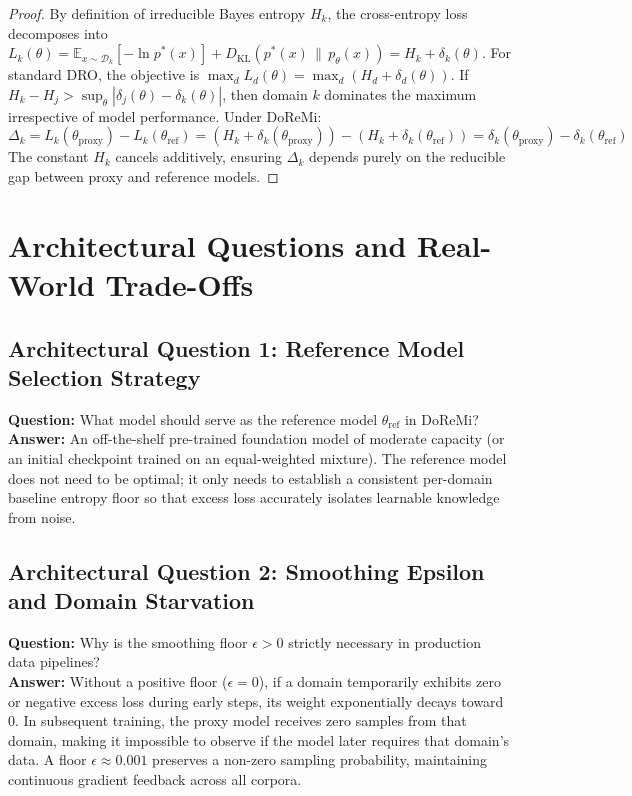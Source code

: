 \documentclass[11pt,a4paper]{article}
\theoremstyle{definition}
\begin{document}
\begin{proof}
By definition of irreducible Bayes entropy $H_k$, the cross-entropy loss decomposes into $L_k(\theta) = \mathbb{E}_{x \sim \mathcal{D}_k}[-\ln p^*(x)] + D_{\text{KL}}(p^*(x) \,\|\, p_\theta(x)) = H_k + \delta_k(\theta)$.
For standard DRO, the objective is $\max_d L_d(\theta) = \max_d (H_d + \delta_d(\theta))$. If $H_k - H_j > \sup_\theta |\delta_j(\theta) - \delta_k(\theta)|$, then domain $k$ dominates the maximum irrespective of model performance.
Under DoReMi:
\begin{equation}
\Delta_k = L_k(\theta_{\text{proxy}}) - L_k(\theta_{\text{ref}}) = \left(H_k + \delta_k(\theta_{\text{proxy}})\right) - \left(H_k + \delta_k(\theta_{\text{ref}})\right) = \delta_k(\theta_{\text{proxy}}) - \delta_k(\theta_{\text{ref}})
\end{equation}
The constant $H_k$ cancels additively, ensuring $\Delta_k$ depends purely on the reducible gap between proxy and reference models.
\end{proof}

\section{Architectural Questions and Real-World Trade-Offs}

\subsection{Architectural Question 1: Reference Model Selection Strategy}
\textbf{Question:} What model should serve as the reference model $\theta_{\text{ref}}$ in DoReMi?\\
\textbf{Answer:} An off-the-shelf pre-trained foundation model of moderate capacity (or an initial checkpoint trained on an equal-weighted mixture). The reference model does not need to be optimal; it only needs to establish a consistent per-domain baseline entropy floor so that excess loss accurately isolates learnable knowledge from noise.

\subsection{Architectural Question 2: Smoothing Epsilon and Domain Starvation}
\textbf{Question:} Why is the smoothing floor $\epsilon > 0$ strictly necessary in production data pipelines?\\
\textbf{Answer:} Without a positive floor ($\epsilon = 0$), if a domain temporarily exhibits zero or negative excess loss during early steps, its weight exponentially decays toward 0. In subsequent training, the proxy model receives zero samples from that domain, making it impossible to observe if the model later requires that domain's data. A floor $\epsilon \approx 0.001$ preserves a non-zero sampling probability, maintaining continuous gradient feedback across all corpora.
\end{document}
